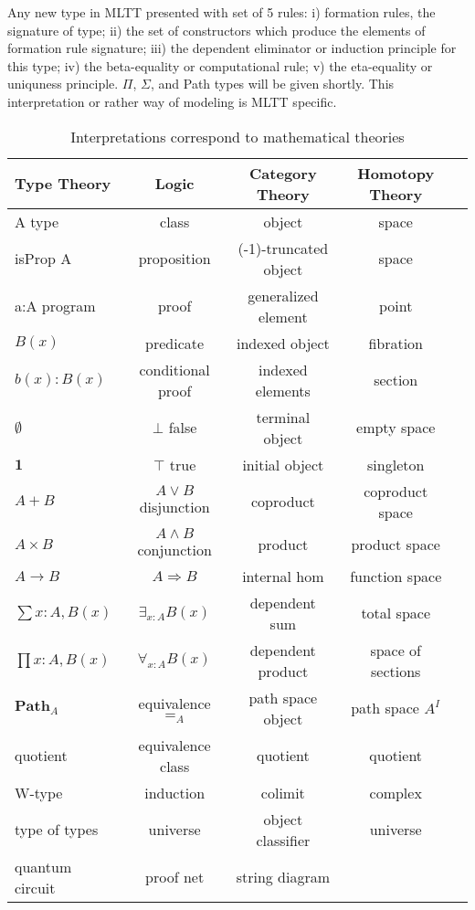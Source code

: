 Any new type in MLTT presented with set of 5 rules: i) formation rules, the signature of type;
ii) the set of constructors which produce the elements of formation rule signature;
iii) the dependent eliminator or induction principle for this type;
iv) the beta-equality or computational rule;
v) the eta-equality or uniquness principle. $\Pi$, $\Sigma$, and Path
types will be given shortly. This interpretation or rather way of modeling is MLTT specific.

\begin{table}
\centering
  \caption{Interpretations correspond to mathematical theories}
 \begin{tabular}{lcccc}
    \hline
       Type Theory & Logic & Category Theory & Homotopy Theory\\
    \hline
       A type & class & object & space \\
       isProp A & proposition & (-1)-truncated object & space \\
       a:A program & proof & generalized element & point \\
       $B(x)$ & predicate & indexed object & fibration \\
       $b(x) : B(x)$ & conditional proof & indexed elements & section\\
       $\emptyset$ & $\bot$ false & terminal object & empty space \\
       $\mathbf{1}$ & $\top$ true & initial object & singleton \\
       $A + B$ & $A\vee B$ disjunction & coproduct & coproduct space \\
       $A\times B$ & $A\wedge B$ conjunction & product & product space \\
       $A\to B$ & $A\Rightarrow B$ & internal hom & function space \\
       $\sum{x:A},B(x)$ & $\exists_{x:A}B(x)$ & dependent sum & total space \\
       $\prod{x:A},B(x)$ & $\forall_{x:A}B(x)$ & dependent product & space of sections\\
       $\mathbf{Path}_{A}$ & equivalence $=_A$ & path space object & path space $A^I$ \\
       quotient & equivalence class & quotient & quotient \\
       W-type & induction & colimit & complex\\
       type of types & universe & object classifier & universe \\
       quantum circuit & proof net & string diagram & \\
      \hline
  \end{tabular}
\end{table}

